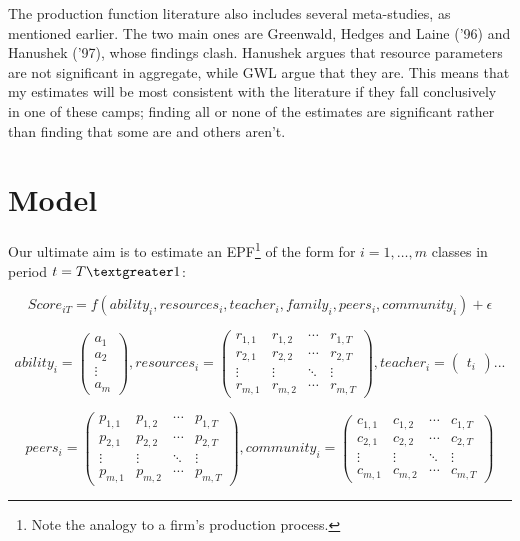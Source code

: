 \documentclass[11pt]{article}
\begin{document}
The production function literature also includes several meta-studies, as mentioned earlier. The two main ones are Greenwald, Hedges and Laine ('96) and Hanushek ('97), whose findings clash. Hanushek argues that resource parameters are not significant in aggregate, while GWL argue that they are. This means that my estimates will be most consistent with the literature if they fall conclusively in one of these camps; finding all or none of the estimates are significant rather than finding that some are and others aren't.


\section{Model}
\label{s:next}

Our ultimate aim is to estimate an EPF\footnote{Note the analogy to a firm's production process.} of the form for $i=1,\ldots,m$ classes in period $t=T\textgreater1$:

$$Score_{iT} = f(ability_{i},resources_{i},teacher_{i},family_{i},peers_{i},community_{i}) + \epsilon$$

$$ability_{i} = 
 \begin{pmatrix}
  a_{1} \\
  a_{2} \\
  \vdots  \\
  a_{m}  
 \end{pmatrix} ,
 resources_{i} = 
 \begin{pmatrix}
  r_{1,1} & r_{1,2} & \cdots & r_{1,T} \\
  r_{2,1} & r_{2,2} & \cdots & r_{2,T} \\
  \vdots  & \vdots  & \ddots & \vdots  \\
  r_{m,1} & r_{m,2} & \cdots & r_{m,T} 
 \end{pmatrix},
  teacher_{i} = 
 \begin{pmatrix}
  t_{i}  
 \end{pmatrix}
 ...$$
 
 $$peers_{i} = 
 \begin{pmatrix}
  p_{1,1} & p_{1,2} & \cdots & p_{1,T} \\
  p_{2,1} & p_{2,2} & \cdots & p_{2,T} \\
  \vdots  & \vdots  & \ddots & \vdots  \\
  p_{m,1} & p_{m,2} & \cdots & p_{m,T} 
 \end{pmatrix},
  community_{i} = 
 \begin{pmatrix}
  c_{1,1} & c_{1,2} & \cdots & c_{1,T} \\
  c_{2,1} & c_{2,2} & \cdots & c_{2,T} \\
  \vdots  & \vdots  & \ddots & \vdots  \\
  c_{m,1} & c_{m,2} & \cdots & c_{m,T} 
 \end{pmatrix}$$
 
\end{document}
